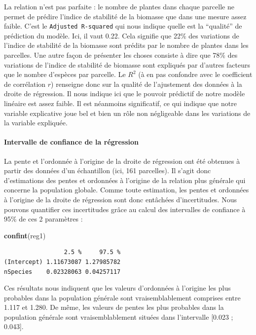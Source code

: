 \documentclass[a4paperpaper,]{article}
\newenvironment{Shaded}{\begin{snugshade}}{\end{snugshade}}
\newcommand{\KeywordTok}[1]{\textcolor[rgb]{0.12,0.11,0.11}{\textbf{#1}}}
\newcommand{\NormalTok}[1]{\textcolor[rgb]{0.12,0.11,0.11}{#1}}
\let\oldparagraph\paragraph
\renewcommand{\paragraph}[1]{\oldparagraph{#1}\mbox{}}
\begin{document}
La relation n'est pas parfaite : le nombre de plantes dans chaque parcelle ne permet de prédire l'indice de stabilité de la biomasse que dans une mesure assez faible. C'est le \texttt{Adjusted\ R-squared} qui nous indique quelle est la ``qualité'' de prédiction du modèle. Ici, il vaut 0.22. Cela signifie que 22\% des variations de l'indice de stabilité de la biomasse sont prédits par le nombre de plantes dans les parcelles. Une autre façon de présenter les choses consiste à dire que 78\% des variations de l'indice de stabilité de biomasse sont expliqués par d'autres facteurs que le nombre d'espèces par parcelle. Le \(R^2\) (à en pas confondre avec le coefficient de corrélation \(r\)) renseigne donc sur la qualité de l'ajustement des données à la droite de régression. Il nous indique ici que le pouvoir prédictif de notre modèle linéaire est assez faible. Il est néanmoins significatif, ce qui indique que notre variable explicative joue bel et bien un rôle non négligeable dans les variations de la variable expliquée.

\hypertarget{intervalle-de-confiance-de-la-ruxe9gression}{%
\paragraph{Intervalle de confiance de la régression}\label{intervalle-de-confiance-de-la-ruxe9gression}}

La pente et l'ordonnée à l'origine de la droite de régression ont été obtenues à partir des données d'un échantillon (ici, 161 parcelles). Il s'agit donc d'estimations des pentes et ordonnées à l'origine de la relation plus générale qui concerne la population globale. Comme toute estimation, les pentes et ordonnées à l'origine de la droite de régression sont donc entâchées d'incertitudes. Nous pouvons quantifier ces incertitudes grâce au calcul des intervalles de confiance à 95\% de ces 2 paramètres :

\begin{Shaded}
\begin{Highlighting}[]
\KeywordTok{confint}\NormalTok{(reg1)}
\end{Highlighting}
\end{Shaded}

\begin{verbatim}
                 2.5 %     97.5 %
(Intercept) 1.11673087 1.27985782
nSpecies    0.02328063 0.04257117
\end{verbatim}

Ces résultats nous indiquent que les valeurs d'ordonnées à l'origine les plus probables dans la population générale sont vraisemblablement comprises entre 1.117 et 1.280. De même, les valeurs de pentes les plus probables dans la population générale sont vraisemblablement situées dans l'intervalle {[}0.023 ; 0.043{]}.
\end{document}
